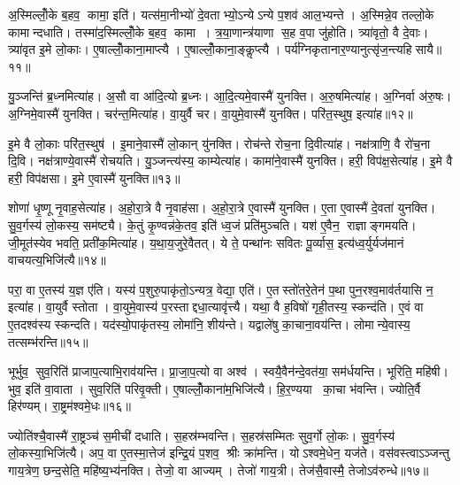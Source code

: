 अ॒स्मिल्लोँ॒के ब॒हव॒ कामा॒ इति॑। यत्स॑मा॒नीभ्यो॑ दे॒वताभ्यो॒ऽन्येऽन्ये प॒शव॑ आल॒भ्यन्ते। अ॒स्मिन्ने॒व तल्लो॒के कामान्दधाति। तस्मा॑द॒स्मिल्लोँ॒के ब॒हव॒ कामा। त्र॒या॒णान्त्र॑याणा स॒ह व॒पा जु॑होति। त्र्या॑वृतो॒ वै दे॒वाः। त्र्या॑वृत इ॒मे लो॒काः। ए॒षाल्लोँ॒काना॒माप्त्यै। ए॒षाल्लोँ॒काना॒ङ्कॢप्त्यै। पर्य॑ग्निकृतानार॒ण्यानुत्सृ॑ज॒न्त्यहिसायै॥११॥\anuvakamend[अव॑रुद्ध्या उ॒भयान्प॒शूनाल॑भते स॒त्यादहिसायै]

यु॒ञ्जन्ति॑ ब्र॒ध्नमित्या॑ह। अ॒सौ वा आ॑दि॒त्यो ब्र॒ध्नः। आ॒दि॒त्यमे॒वास्मै॑ युनक्ति। अ॒रु॒षमित्या॑ह। अ॒ग्निर्वा अ॑रु॒षः। अ॒ग्निमे॒वास्मै॑ युनक्ति। चर॑न्त॒मित्या॑ह। वा॒युर्वै चर\sn{}। वा॒युमे॒वास्मै॑ युनक्ति। परि॑त॒स्थुष॒ इत्या॑ह॥१२॥

इ॒मे वै लो॒काः परि॑त॒स्थुष॑। इ॒माने॒वास्मै॑ लो॒कान् यु॑नक्ति। रोच॑न्ते रोच॒ना दि॒वीत्या॑ह। नक्ष॑त्राणि॒ वै रो॑च॒ना दि॒वि। नक्ष॑त्राण्ये॒वास्मै॑ रोचयति। यु॒ञ्जन्त्य॑स्य॒ काम्येत्या॑ह। कामा॑ने॒वास्मै॑ युनक्ति। हरी॒ विप॑क्ष॒सेत्या॑ह। इ॒मे वै हरी॒ विप॑क्षसा। इ॒मे ए॒वास्मै॑ युनक्ति॥१३॥

शोणा॑ धृ॒ष्णू नृ॒वाह॒सेत्या॑ह। अ॒हो॒रा॒त्रे वै नृ॒वाह॑सा। अ॒हो॒रा॒त्रे ए॒वास्मै॑ युनक्ति। ए॒ता ए॒वास्मै॑ दे॒वता॑ युनक्ति। सु॒व॒र्गस्य॑ लो॒कस्य॒ सम॑ष्ट्यै। के॒तुं कृ॒ण्वन्न॑के॒तव॒ इति॑ ध्व॒जं प्रति॑मुञ्चति। यश॑ ए॒वैन॒ राज्ञाङ्गमयति। जी॒मूत॑स्येव भवति॒ प्रती॑क॒मित्या॑ह। य॒था॒य॒जुरे॒वैतत्। ये ते॒ पन्था॑नः सवितः पू॒र्व्यास॒ इत्य॑ध्व॒र्युर्यज॑मानं वाचयत्य॒भिजि॑त्यै॥१४॥

परा॒ वा ए॒तस्य॑ य॒ज्ञ ए॑ति। यस्य॑ प॒शुरु॒पाकृ॑तो॒ऽन्यत्र॒ वेद्या॒ एति॑। ए॒तस्तो॑तरे॒तेन॑ प॒था पुन॒रश्व॒माव॑र्तयासि न॒ इत्या॑ह। वा॒युर्वै स्तोता। वा॒युमे॒वास्य॑ प॒रस्ताद्दधा॒त्यावृ॑त्त्यै। यथा॒ वै ह॒विषो॑ गृही॒तस्य॒ स्कन्द॑ति। ए॒वं वा ए॒तदश्व॑स्य स्कन्दति। यद॑स्यो॒पाकृ॑तस्य॒ लोमा॑नि॒ शीय॑न्ते। यद्वाले॑षु का॒चाना॒वय॑न्ति। लोमान्ये॒वास्य॒ तत्सम्भ॑रन्ति॥१५॥

भूर्भुव॒ सुव॒रिति॑ प्राजाप॒त्याभि॒राव॑यन्ति। प्रा॒जा॒प॒त्यो वा अश्व॑। स्वयै॒वैन॑न्दे॒वत॑या॒ सम॑र्धयन्ति। भूरिति॒ महि॑षी। भुव॒ इति॑ वा॒वाता। सुव॒रिति॑ परिवृ॒क्ती। ए॒षाल्लोँ॒काना॑म॒भिजि॑त्यै। हि॒र॒ण्यया का॒चा भ॑वन्ति। ज्योति॒र्वै हिर॑ण्यम्। रा॒ष्ट्रम॑श्वमे॒धः॥१६॥

ज्योति॑श्चै॒वास्मै॑ रा॒ष्ट्रञ्च॑ स॒मीची॑ दधाति। स॒हस्र॑म्भवन्ति। स॒हस्र॑सम्मितः सुव॒र्गो लो॒कः। सु॒व॒र्गस्य॑ लो॒कस्या॒भिजि॑त्यै। अप॒ वा ए॒तस्मा॒त्तेज॑ इन्द्रि॒यं प॒शव॒ श्रीः क्रा॑मन्ति। योऽश्वमे॒धेन॒ यज॑ते। वस॑वस्त्वाऽञ्जन्तु गाय॒त्रेण॒ छन्द॒सेति॒ महि॑ष्य॒भ्य॑नक्ति। तेजो॒ वा आज्यम्। तेजो॑ गाय॒त्री। तेज॑सै॒वास्मै॒ तेजोऽव॑रुन्धे॥१७॥


